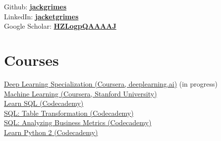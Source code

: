 \documentclass[]{cv-template}
\begin{document}
\begin{minipage}[t]{0.33\textwidth}
Github: \href{https://github.com/jackgrimes}{\bf jackgrimes} \\
LinkedIn: \href{https://www.linkedin.com/in/jacketgrimes}{\bf jacketgrimes} \\
Google Scholar: \href{https://scholar.google.co.uk/citations?hl=en&user=HZLogpQAAAAJ}{\bf HZLogpQAAAAJ} \\
\sectionsep


\section{Courses}
\href{https://www.coursera.org/specializations/deep-learning}{Deep Learning Specialization (Coursera, deeplearning.ai)} (in progress)\\
\href{https://www.coursera.org/learn/machine-learning}{Machine Learning (Coursera, Stanford University)} \\
\href{https://www.codecademy.com/learn/learn-sql}{Learn SQL (Codecademy)} \\
\href{https://www.codecademy.com/learn/sql-table-transformation}{SQL: Table Transformation (Codecademy)} \\
\href{https://www.codecademy.com/learn/sql-analyzing-business-metrics}{SQL: Analyzing Business Metrics (Codecademy)} \\
\href{https://www.codecademy.com/learn/learn-python}{Learn Python 2 (Codecademy)} \\
\sectionsep



\end{minipage}
\end{document}
